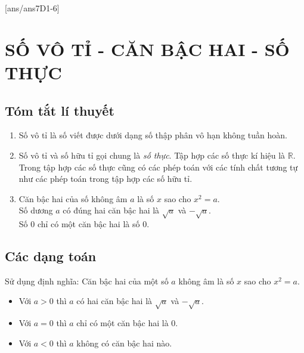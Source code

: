 [ans/ans7D1-6]
\section{SỐ VÔ TỈ - CĂN BẬC HAI - SỐ THỰC}
\subsection{Tóm tắt lí thuyết}
\begin{enumerate}[\tickEX]
	\item Số vô tỉ là số viết được dưới dạng số thập phân vô hạn không tuần hoàn.
	\item Số vô tỉ và số hữu tỉ gọi chung là \textit{số thực}. Tập hợp các số thực kí hiệu là $\mathbb{R}$.\\
	Trong tập hợp các số thực cũng có các phép toán với các tính chất tương tự như các phép toán trong tập hợp các số hữu tỉ.
	\item Căn bậc hai của số không âm $a$ là số $x$ sao cho $x^2=a$.\\
	Số dương $a$ có đúng hai căn bậc hai là $\sqrt a$ và $-\sqrt a$.\\
	Số $0$ chỉ có một căn bậc hai là số $0$.
\end{enumerate}
\subsection{Các dạng toán}
\begin{dang}
	Sử dụng định nghĩa: Căn bậc hai của một số $a$ không âm là số $x$ sao cho $x^2=a$.
	\begin{itemize}
	\item Với $a>0$ thì $a$ có hai căn bậc hai là $\sqrt a$ và $-\sqrt a$.
	\item Với $a=0$ thì $a$ chỉ có một căn bậc hai là $0$.
	\item Với $a<0$ thì $a$ không có căn bậc hai nào.
\end{itemize}
\end{dang}

